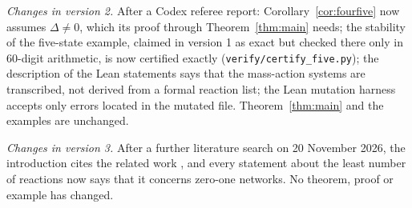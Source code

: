 \documentclass[11pt]{article}
\theoremstyle{remark}\newtheorem{remark}[theorem]{Remark}
\begin{document}
\emph{Changes in version 2.} After a Codex referee report: Corollary~\ref{cor:fourfive} now assumes
$\Delta\ne0$, which its proof through Theorem~\ref{thm:main} needs; the stability of the five-state example,
claimed in version 1 as exact but checked there only in 60-digit arithmetic, is now certified exactly
(\texttt{verify/certify\_five.py}); the description of the Lean statements says that the mass-action systems
are transcribed, not derived from a formal reaction list; the Lean mutation harness accepts only errors located
in the mutated file. Theorem~\ref{thm:main} and the examples are unchanged.

\emph{Changes in version 3.} After a further literature search on 20 November 2026,
the introduction cites the related work \cite{BF,PR,Anon,Takimoto}, and every
statement about the least number of reactions now says that it concerns
zero-one networks. No theorem, proof or example has changed.
\end{document}
